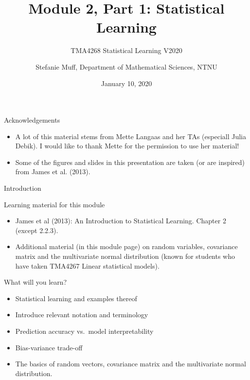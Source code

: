 \documentclass[ignorenonframetext,]{beamer}
\title{Module 2, Part 1: Statistical Learning}
\subtitle{TMA4268 Statistical Learning V2020}
\author{Stefanie Muff, Department of Mathematical Sciences, NTNU}
\date{January 10, 2020}
\providecommand{\tightlist}{%
  \setlength{\itemsep}{0pt}\setlength{\parskip}{0pt}}
\begin{document}
\frame{\titlepage}

\begin{frame}{Acknowledgements}

\begin{itemize}
\item
  A lot of this material stems from Mette Langaas and her TAs (especiall
  Julia Debik). I would like to thank Mette for the permission to use
  her material!
\item
  Some of the figures and slides in this presentation are taken (or are
  inspired) from James et al. (2013).
\end{itemize}

\end{frame}

\begin{frame}{Introduction}

\begin{block}{Learning material for this module}

\begin{itemize}
\tightlist
\item
  James et al (2013): An Introduction to Statistical Learning. Chapter 2
  (except 2.2.3).\\
\item
  Additional material (in this module page) on random variables,
  covariance matrix and the multivariate normal distribution (known for
  students who have taken TMA4267 Linear statistical models).
\end{itemize}

\end{block}

\end{frame}

\begin{frame}

\begin{block}{What will you learn?}

\vspace{2mm}

\begin{itemize}
\item
  Statistical learning and examples thereof \vspace{1mm}
\item
  Introduce relevant notation and terminology \vspace{1mm}
\item
  Prediction accuracy vs.~model interpretability \vspace{1mm}
\item
  Bias-variance trade-off \vspace{1mm}
\item
  The basics of random vectors, covariance matrix and the multivariate
  normal distribution.
\end{itemize}

\end{block}

\end{frame}
\end{document}
